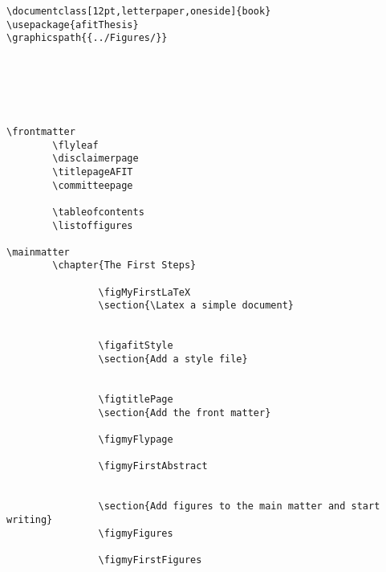 \vspace{-0.25in}
{\singlespace
\begin{verbatim}
\documentclass[12pt,letterpaper,oneside]{book}
\usepackage{afitThesis}
\graphicspath{{../Figures/}}






\frontmatter
        \flyleaf                        
        \disclaimerpage                 
        \titlepageAFIT                      
        \committeepage  
        
        \tableofcontents
        \listoffigures
        
\mainmatter
        \chapter{The First Steps}
                		
                \figMyFirstLaTeX
                \section{\Latex a simple document}
                		

                \figafitStyle
                \section{Add a style file}
                		

                \figtitlePage
                \section{Add the front matter}
                
                \figmyFlypage
                
                \figmyFirstAbstract
                

                \section{Add figures to the main matter and start writing}
                \figmyFigures
                
                \figmyFirstFigures
                

\end{verbatim}
}
\vspace{-0.25in}

